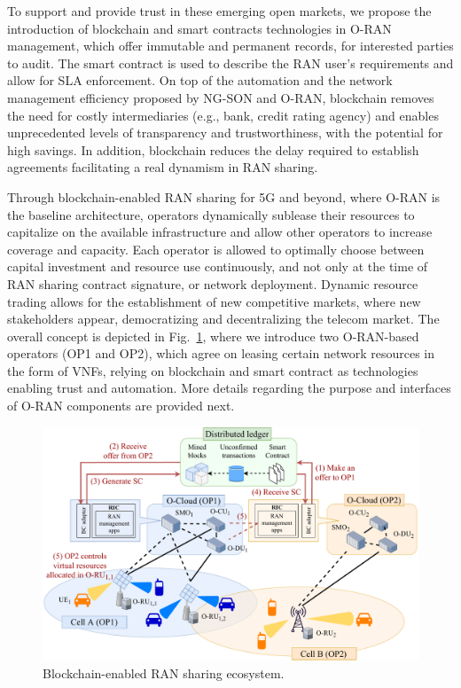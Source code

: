 \documentclass[journal]{IEEEtran}
\begin{document}
	To support and provide trust in these emerging open markets, we propose the introduction of blockchain and smart contracts technologies in O-RAN management, which offer immutable and permanent records, for interested parties to audit. The smart contract is used to describe the RAN user's requirements and allow for SLA enforcement. On top of the automation and the network management efficiency proposed by NG-SON and O-RAN, blockchain removes the need for costly intermediaries (e.g., bank, credit rating agency) and enables unprecedented levels of transparency and trustworthiness, with the potential for high savings. In addition, blockchain reduces the delay required to establish agreements facilitating a real dynamism in RAN sharing.

	Through blockchain-enabled RAN sharing for 5G and beyond, where O-RAN is the baseline architecture, operators dynamically sublease their resources to capitalize on the available infrastructure and allow other operators to increase coverage and capacity. Each operator is allowed to optimally choose between capital investment and resource use continuously, and not only at the time of RAN sharing contract signature, or network deployment. Dynamic resource trading allows for the establishment of new competitive markets, where new stakeholders appear, democratizing and decentralizing the telecom market. The overall concept is depicted in Fig.~\ref{fig:blockchain_ecosystem}, where we introduce two O-RAN-based operators (OP1 and OP2), which agree on leasing certain network resources in the form of VNFs, relying on blockchain and smart contract as technologies enabling trust and automation. More details regarding the purpose and interfaces of O-RAN components are provided next.
	
	\begin{figure}[ht!]
		\includegraphics[width=\linewidth]{blockchain_ran-ecosystem}
		\caption{Blockchain-enabled RAN sharing ecosystem.}
		\label{fig:blockchain_ecosystem}
	\end{figure} 
	
\end{document}
